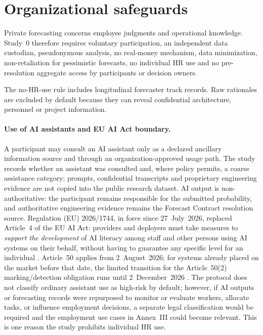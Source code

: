 \section{Organizational safeguards}
Private forecasting concerns employee judgments and operational knowledge. Study~0 therefore requires voluntary participation, an independent data custodian, pseudonymous analysis, no real-money mechanism, data minimization, non-retaliation for pessimistic forecasts, no individual HR use and no pre-resolution aggregate access by participants or decision owners.

The no-HR-use rule includes longitudinal forecaster track records. Raw rationales are excluded by default because they can reveal confidential architecture, personnel or project information.

\paragraph{Use of AI assistants and EU AI Act boundary.}
A participant may consult an AI assistant only as a declared ancillary information source and through an organization-approved usage path. The study records whether an assistant was consulted and, where policy permits, a coarse assistance category; prompts, confidential transcripts and proprietary engineering evidence are not copied into the public research dataset. AI output is non-authoritative: the participant remains responsible for the submitted probability, and authoritative engineering evidence remains the Forecast Contract resolution source. Regulation (EU) 2026/1744, in force since 27~July~2026, replaced Article~4 of the EU AI Act: providers and deployers must take measures to \emph{support the development} of AI literacy among staff and other persons using AI systems on their behalf, without having to guarantee any specific level for an individual \citep{euai2026}. Article~50 applies from 2~August~2026; for systems already placed on the market before that date, the limited transition for the Article~50(2) marking/detection obligation runs until 2~December~2026 \citep{ec2026transparency}. The protocol does not classify ordinary assistant use as high-risk by default; however, if AI outputs or forecasting records were repurposed to monitor or evaluate workers, allocate tasks, or influence employment decisions, a separate legal classification would be required and the employment use cases in Annex~III could become relevant. This is one reason the study prohibits individual HR use.


